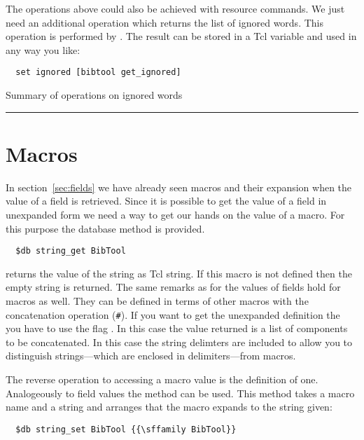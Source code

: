 The operations above could also be achieved with resource commands. We
just need an additional operation which returns the list of ignored
words. This operation is performed by . The
result can be stored in a Tcl variable and used in any way you like:
\begin{verbatim}
  set ignored [bibtool get_ignored]
\end{verbatim}%


\begin{table}[tp]
    

  \caption{Summary of operations on ignored words}\label{fig:tcl-ignored}
  \rule{\textwidth}{.1pt}
\end{table}

\section{\BibTeX{} Macros}

In section~\ref{sec:fields} we have already seen \BibTeX{} macros and
their expansion when the value of a field is retrieved. Since it is
possible to get the value of a field in unexpanded form we need a way
to get our hands on the value of a macro. For this purpose the database
method  is provided.
\begin{verbatim}
  $db string_get BibTool
\end{verbatim}%
\noindent returns the value of the string  as Tcl
string. If this macro is not defined then the empty string is
returned. The same remarks as for the values of fields hold for
\BibTeX{} macros as well. They can be defined in terms of other macros
with the concatenation operation (\verb|#|). If you want to get the
unexpanded definition the you have to use the flag . In
this case the value returned is a list of components to be
concatenated. In this case the string delimters are included to allow
you to distinguish strings---which are enclosed in delimiters---from
macros. 

The reverse operation to accessing a macro value is the definition of
one. Analogeously to field values the method 
can be used. This method takes a macro name and a string and arranges
that the macro expands to the string given:
\begin{verbatim}
  $db string_set BibTool {{\sffamily BibTool}}
\end{verbatim}%

